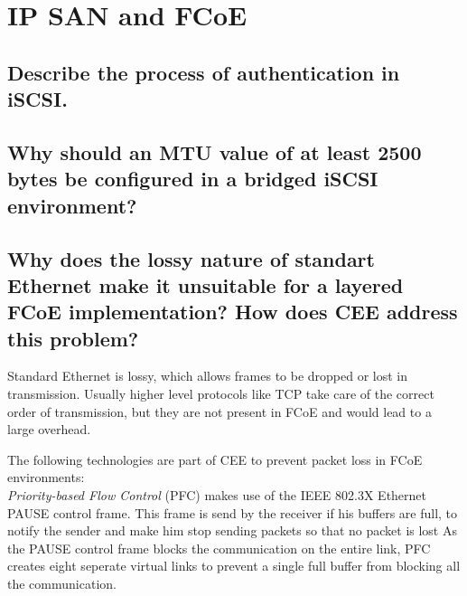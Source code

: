 \section{IP SAN and FCoE} %
\label{sec:ip_san_and_fcoe}

\subsection{Describe the process of authentication in iSCSI.} %
\label{sub:describe_the_process_of_authentication_in_iscsi}


\subsection{Why should an MTU value of at least 2500 bytes be configured in a bridged iSCSI environment?} %
\label{sub:why_should_an_mtu_value_of_at_least_2500_bytes_be_configured_in_a_bridged_iscsi_environment}


\subsection{Why does the lossy nature of standart Ethernet make it unsuitable for a layered FCoE implementation? How does CEE address this problem?} %
\label{sub:why_does_the_lossy_nature_of_standart_ethernet_make_it_unsuitable_for_a_layered_fcoe_implementation_how_does_cee_address_this_problem}   	
	Standard Ethernet is lossy,
	which allows frames to be dropped or lost in transmission.
	Usually higher level protocols like TCP take care of the correct order of transmission,
	but they are not present in FCoE and would lead to a large overhead.

	The following technologies are part of CEE to prevent packet loss in FCoE environments:\\
	\emph{Priority-based Flow Control} (PFC) makes use of the IEEE 802.3X Ethernet PAUSE control frame.
	This frame is send by the receiver if his buffers are full,
	to notify the sender and make him stop sending packets
	so that no packet is lost
	As the PAUSE control frame blocks the communication on the entire link,
	PFC creates eight seperate virtual links to prevent a single full buffer from blocking
	all the communication.

